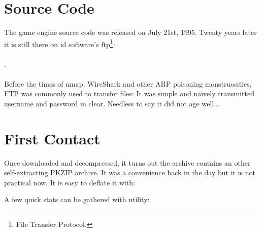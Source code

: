 \documentclass[book.tex]{subfiles}
\begin{document}
\section{Source Code}
The game engine source code was released on July 21st, 1995. Twenty years later it is still there on id software's ftp\footnote{File Transfer Protocol.}:\\ 
\\.\\
\\
 Before the times of nmap, WireShark and other ARP poisoning monstruosities, FTP was commonly used to transfer files: It was simple and naively transmitted username and password in clear. Needless to say it did not age well...\\

\section{First Contact}
Once downloaded and decompressed, it turns out the archive  contains an other self-extracting PKZIP archive. It was a convenience back in the day but it is not practical now. It is easy to deflate it with:\\
\par
\begin{minipage}{\textwidth}

\end{minipage}
\par
A few quick stats can be gathered with  utility:\\

\par
\begin{minipage}{\textwidth}

\end{minipage}
\end{document}

